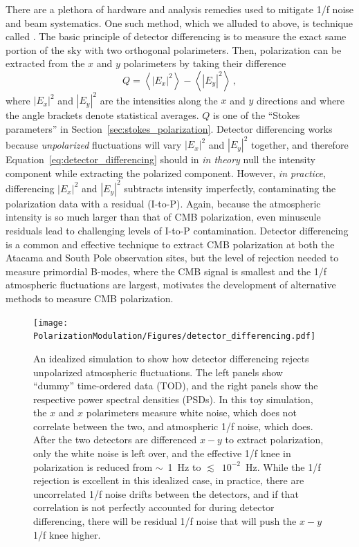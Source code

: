 There are a plethora of hardware and analysis remedies used to mitigate 1/f noise and beam systematics. One such method, which we alluded to above, is technique called . The basic principle of detector differencing is to measure the exact same portion of the sky with two orthogonal polarimeters. Then, polarization can be extracted from the $x$ and $y$ polarimeters by taking their difference
\begin{equation}
    Q = \left< \left| E_{x} \right|^{2} \right> - \left< \left| E_{y} \right|^{2} \right> \, ,
    \label{eq:detector_differencing}
\end{equation}
where $| E_{x} |^{2}$ and $| E_{y} |^{2}$ are the intensities along the $x$ and $y$ directions and where the angle brackets denote statistical averages. $Q$ is one of the ``Stokes parameters'' in Section~\ref{sec:stokes_polarization}. Detector differencing works because \textit{unpolarized} fluctuations will vary $| E_{x} |^{2}$ and $| E_{y} |^{2}$ together, and therefore Equation~\ref{eq:detector_differencing} should in \textit{in theory} null the intensity component while extracting the polarized component. However, \textit{in practice}, differencing $| E_{x} |^{2}$ and $| E_{y} |^{2}$ subtracts intensity imperfectly, contaminating the polarization data with a residual  (I-to-P). Again, because the atmospheric intensity is so much larger than that of CMB polarization, even minuscule residuals lead to challenging levels of I-to-P contamination. Detector differencing is a common and effective technique to extract CMB polarization at both the Atacama and South Pole observation sites, but the level of rejection needed to measure primordial B-modes, where the CMB signal is smallest and the 1/f atmospheric fluctuations are largest, motivates the development of alternative methods to measure CMB polarization.

\begin{figure}[!t]
    \centering
    \texttt{[image: PolarizationModulation/Figures/detector\_differencing.pdf]}
    \caption{An idealized simulation to show how detector differencing rejects unpolarized atmospheric fluctuations. The left panels show ``dummy'' time-ordered data (TOD), and the right panels show the respective power spectral densities (PSDs). In this toy simulation, the $x$ and $x$ polarimeters measure white noise, which does not correlate between the two, and atmospheric 1/f noise, which does. After the two detectors are differenced $x - y$ to extract polarization, only the white noise is left over, and the effective 1/f knee in polarization is reduced from $\sim$~1~Hz to $\lesssim$~$10^{-2}$~Hz. While the 1/f rejection is excellent in this idealized case, in practice, there are uncorrelated 1/f noise drifts between the detectors, and if that correlation is not perfectly accounted for during detector differencing, there will be residual 1/f noise that will push the $x - y$ 1/f knee higher.}
    \label{fig:detector_differencing}
\end{figure}


